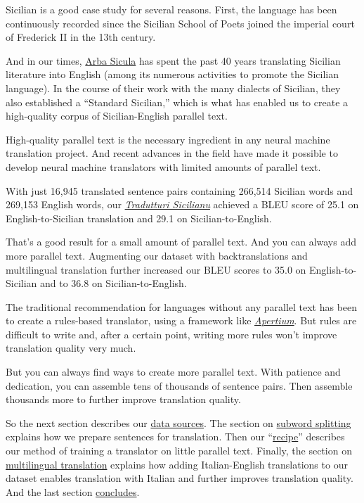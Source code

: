 \documentclass[10pt,letterpaper]{article}
\begin{document}
Sicilian is a good case study for several reasons. First, the language has been continuously recorded since the 
Sicilian School of Poets joined the imperial court of Frederick II in the 13th century.

And in our times, \href{https://www.arbasicula.org/}{Arba Sicula}
has spent the past 40 years translating Sicilian literature into English
(among its numerous activities to promote the Sicilian language).
In the course of their work with the many dialects of Sicilian, they also established a ``Standard Sicilian,''
which is what has enabled us to create a high-quality corpus of Sicilian-English parallel text.

High-quality parallel text is the necessary ingredient in any neural machine translation project.
And recent advances in the field have made it possible to develop neural machine translators with
limited amounts of parallel text.

With just 16,945 translated sentence pairs containing 266,514 Sicilian words and 269,153 English words,
our \href{https://translate.napizia.com/}{\textit{Tradutturi Sicilianu}}
achieved a BLEU score of 25.1 on English-to-Sicilian translation and 29.1 on Sicilian-to-English.
      
That's a good result for a small amount of parallel text.  And you can always add more parallel text.
Augmenting our dataset with backtranslations and multilingual translation further increased our
BLEU scores to 35.0 on English-to-Sicilian and to 36.8 on Sicilian-to-English.

The traditional recommendation for languages without any parallel text has been to create
a rules-based translator, using a framework like
\href{https://www.apertium.org/}{\textit{Apertium}}.
But rules are difficult to write and, after a certain point,
writing more rules won't improve translation quality very much.

But you can always find ways to create more parallel text.
With patience and dedication, you can assemble tens of thousands of sentence pairs.
Then assemble thousands more to further improve translation quality.

So the next section describes our \hyperlink{data}{data sources}.  The section on
\hyperlink{subword}{subword splitting} explains how we prepare sentences for translation.
Then our ``\hyperlink{recipe}{recipe}'' describes our method of training a translator on little parallel text.
Finally, the section on \hyperlink{multilingual}{multilingual translation} explains how adding Italian-English
translations to our dataset enables translation with Italian and further improves translation quality.
And the last section \hyperlink{conclusion}{concludes}.
\end{document}

